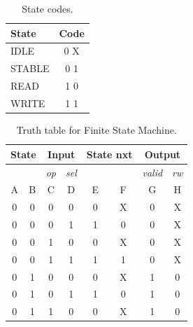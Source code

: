 \begin{table}[H]
    \caption{State codes.}
    \centering
    \begin{tabular}{|l|c|}
        \hline
        State   &   Code    \\  \hline
        IDLE    &   0 X     \\  
        STABLE  &   0 1     \\
        READ    &   1 0     \\
        WRITE   &   1 1     \\  \hline
    \end{tabular}
    \label{tab:03:state_code}
\end{table}


\begin{table}[H]
    \caption{Truth table for Finite State Machine.}
    \centering
    \begin{tabular}{|cc|cc|cc|cc|}
        \hline
        \multicolumn{2}{|c|}{State} & \multicolumn{2}{c|}{Input} & \multicolumn{2}{c|}{State nxt} & \multicolumn{2}{c|}{Output}  \\ \hline
                     &              & \textit{op} & \textit{sel} &                &               & \textit{valid} & \textit{rw} \\
        A            & B            & C           & D            & E              & F             & G     & H                    \\ \hline
        0            & 0            & 0           & 0            & 0              & X             & 0     & X                    \\
        0            & 0            & 0           & 1            & 1              & 0             & 0     & X                    \\
        0            & 0            & 1           & 0            & 0              & X             & 0     & X                    \\
        0            & 0            & 1           & 1            & 1              & 1             & 0     & X                    \\
        0            & 1            & 0           & 0            & 0              & X             & 1     & 0                    \\
        0            & 1            & 0           & 1            & 1              & 0             & 1     & 0                    \\
        0            & 1            & 1           & 0            & 0              & X             & 1     & 0                    \\

\end{tabular}
\end{table}
